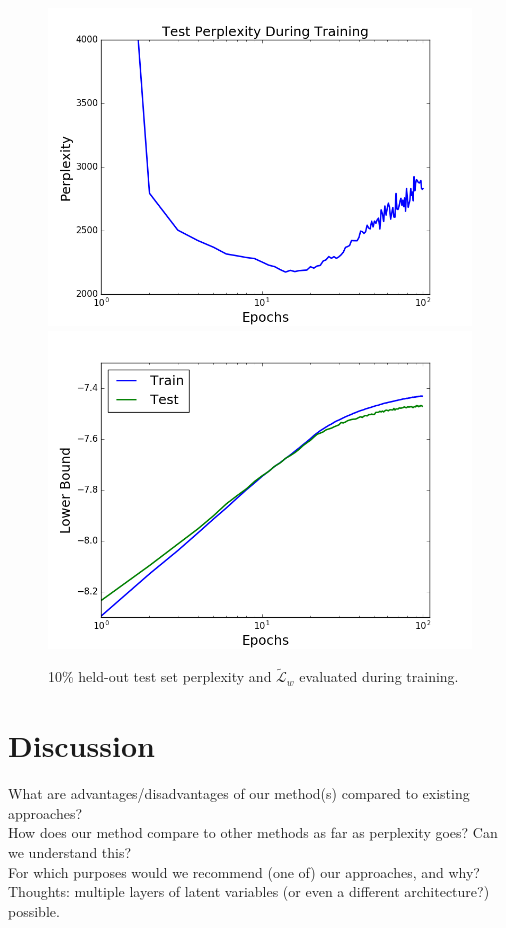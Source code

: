 \documentclass{report}
\begin{document}
	\begin{figure}
		\includegraphics[scale=0.45]{img/10pcperplex.png}
		\includegraphics[scale=0.45]{img/lbcompdef.png}
		\caption{10\% held-out test set perplexity and $\tilde{\mathcal{L}}_w$ evaluated during training.}
		\label{10pctoverfit}
	\end{figure}

	




		
\chapter{Discussion}
What are advantages/disadvantages of our method(s) compared to existing approaches?\\
How does our method compare to other methods as far as perplexity goes? Can we understand this?\\
For which purposes would we recommend (one of) our approaches, and why? \\
Thoughts: multiple layers of latent variables (or even a different architecture?) possible.
\end{document}
